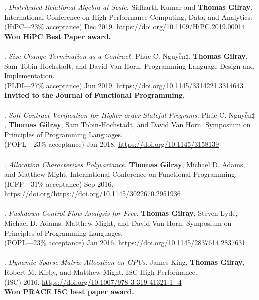 \paper. \textit{Distributed Relational Algebra at Scale.}
Sidharth Kumar and \textbf{Thomas Gilray}.
International Conference on High Performance Computing, Data, and Analytics.
\\(HiPC---23\% acceptance) Dec 2019. \url{https://doi.org/10.1109/HiPC.2019.00014}
\\\textbf{Won HiPC Best Paper award.} \\ \vspace{-0.1cm}\\
\paper. \textit{Size-Change Termination as a Contract.}
Phúc C. Nguyễn$\ddagger$, \textbf{Thomas Gilray}, Sam Tobin-Hochstadt, and David Van Horn.
Programming Language Design and Implementation.
\\(PLDI---27\% acceptance) Jun 2019. \url{https://doi.org/10.1145/3314221.3314643}
\\\textbf{Invited to the Journal of Functional Programming.} \\ \vspace{-0.1cm}\\
\paper. \textit{Soft Contract Verification for Higher-order Stateful Programs.}
Phúc C. Nguyễn$\ddagger$, \textbf{Thomas Gilray}, Sam Tobin-Hochstadt, and David Van Horn.
Symposium on Principles of Programming Languages.
\\(POPL---23\% acceptance) Jan 2018. \url{https://doi.org/10.1145/3158139}
\\ \vspace{-0.1cm}\\
\paper. \textit{Allocation Characterizes Polyvariance.}
\textbf{Thomas Gilray}, Michael D. Adams, and Matthew Might.
International Conference on Functional Programming.
\\(ICFP---31\% acceptance) Sep 2016. \url{https://doi.org/https://doi.org/10.1145/3022670.2951936}
\\ \vspace{-0.1cm}\\
\paper. \textit{Pushdown Control-Flow Analysis for Free.}
\textbf{Thomas Gilray}, Steven Lyde, Michael D. Adams, Matthew Might, and David Van Horn.
Symposium on Principles of Programming Languages.
\\(POPL---23\% acceptance) Jan 2016. \url{https://doi.org/10.1145/2837614.2837631}
\\ \vspace{-0.1cm}\\
\paper. \textit{Dynamic Sparse-Matrix Allocation on GPUs.}
James King, \textbf{Thomas Gilray}, Robert M. Kirby, and Matthew Might.
ISC High Performance.
\\(ISC) 2016. \url{https://doi.org/10.1007/978-3-319-41321-1_4}
\\\textbf{Won PRACE ISC best paper award.} \\ \vspace{-0.1cm}\\
